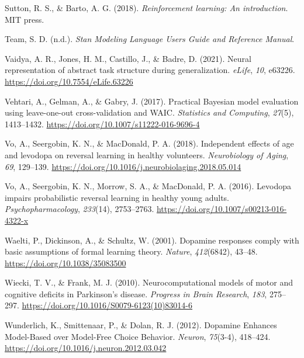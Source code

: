 \documentclass[
  man]{apa6}
\newlength{\cslhangindent}
\newlength{\cslentryspacingunit} %
\newenvironment{CSLReferences}[2] %
 {%
  \setlength{\parindent}{0pt}
  \ifodd #1
  \let\oldpar\par
  \def\par{\hangindent=\cslhangindent\oldpar}
  \fi
  \setlength{\parskip}{#2\cslentryspacingunit}
 }%
 {}
\begin{document}
\begin{CSLReferences}{1}{0}
\leavevmode{}%
Sutton, R. S., \& Barto, A. G. (2018). \emph{Reinforcement learning: {An} introduction}. {MIT press}.

\leavevmode{}%
Team, S. D. (n.d.). \emph{Stan {Modeling Language Users Guide} and {Reference Manual}}.

\leavevmode{}%
Vaidya, A. R., Jones, H. M., Castillo, J., \& Badre, D. (2021). Neural representation of abstract task structure during generalization. \emph{eLife}, \emph{10}, e63226. \url{https://doi.org/10.7554/eLife.63226}

\leavevmode{}%
Vehtari, A., Gelman, A., \& Gabry, J. (2017). Practical {Bayesian} model evaluation using leave-one-out cross-validation and {WAIC}. \emph{Statistics and Computing}, \emph{27}(5), 1413--1432. \url{https://doi.org/10.1007/s11222-016-9696-4}

\leavevmode{}%
Vo, A., Seergobin, K. N., \& MacDonald, P. A. (2018). Independent effects of age and levodopa on reversal learning in healthy volunteers. \emph{Neurobiology of Aging}, \emph{69}, 129--139. \url{https://doi.org/10.1016/j.neurobiolaging.2018.05.014}

\leavevmode{}%
Vo, A., Seergobin, K. N., Morrow, S. A., \& MacDonald, P. A. (2016). Levodopa impairs probabilistic reversal learning in healthy young adults. \emph{Psychopharmacology}, \emph{233}(14), 2753--2763. \url{https://doi.org/10.1007/s00213-016-4322-x}

\leavevmode{}%
Waelti, P., Dickinson, A., \& Schultz, W. (2001). Dopamine responses comply with basic assumptions of formal learning theory. \emph{Nature}, \emph{412}(6842), 43--48. \url{https://doi.org/10.1038/35083500}

\leavevmode{}%
Wiecki, T. V., \& Frank, M. J. (2010). Neurocomputational models of motor and cognitive deficits in {Parkinson}'s disease. \emph{Progress in Brain Research}, \emph{183}, 275--297. \url{https://doi.org/10.1016/S0079-6123(10)83014-6}

\leavevmode{}%
Wunderlich, K., Smittenaar, P., \& Dolan, R. J. (2012). Dopamine {Enhances Model-Based} over {Model-Free Choice Behavior}. \emph{Neuron}, \emph{75}(3-4), 418--424. \url{https://doi.org/10.1016/j.neuron.2012.03.042}

\end{CSLReferences}
\end{document}
